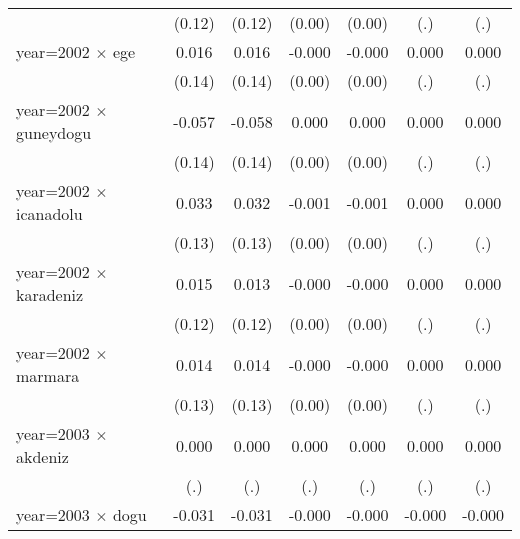 {\begin{tabular}{l*{6}{c}}
                    &      (0.12)         &      (0.12)         &      (0.00)         &      (0.00)         &         (.)         &         (.)         \\
year=2002 $\times$ ege&       0.016         &       0.016         &      -0.000         &      -0.000         &       0.000         &       0.000         \\
                    &      (0.14)         &      (0.14)         &      (0.00)         &      (0.00)         &         (.)         &         (.)         \\
year=2002 $\times$ guneydogu&      -0.057         &      -0.058         &       0.000         &       0.000         &       0.000         &       0.000         \\
                    &      (0.14)         &      (0.14)         &      (0.00)         &      (0.00)         &         (.)         &         (.)         \\
year=2002 $\times$ icanadolu&       0.033         &       0.032         &      -0.001         &      -0.001         &       0.000         &       0.000         \\
                    &      (0.13)         &      (0.13)         &      (0.00)         &      (0.00)         &         (.)         &         (.)         \\
year=2002 $\times$ karadeniz&       0.015         &       0.013         &      -0.000         &      -0.000         &       0.000         &       0.000         \\
                    &      (0.12)         &      (0.12)         &      (0.00)         &      (0.00)         &         (.)         &         (.)         \\
year=2002 $\times$ marmara&       0.014         &       0.014         &      -0.000         &      -0.000         &       0.000         &       0.000         \\
                    &      (0.13)         &      (0.13)         &      (0.00)         &      (0.00)         &         (.)         &         (.)         \\
year=2003 $\times$ akdeniz&       0.000         &       0.000         &       0.000         &       0.000         &       0.000         &       0.000         \\
                    &         (.)         &         (.)         &         (.)         &         (.)         &         (.)         &         (.)         \\
year=2003 $\times$ dogu&      -0.031         &      -0.031         &      -0.000         &      -0.000         &      -0.000         &      -0.000         \\

\end{tabular}}

